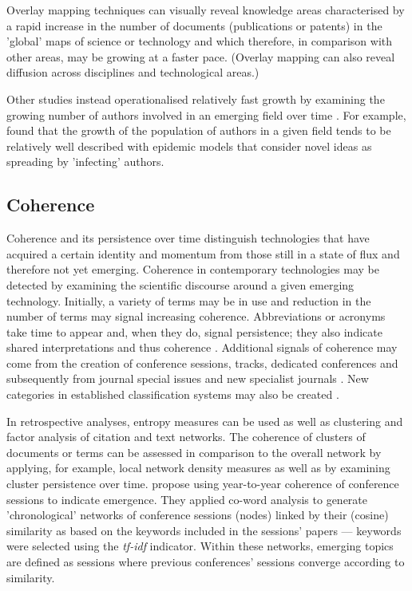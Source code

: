 \documentclass[11pt]{article}
\begin{document}
Overlay mapping techniques can visually reveal knowledge areas characterised by a rapid increase in the number of documents (publications or patents) in the 'global' maps of science or technology and which therefore, in comparison with other areas, may be growing at a faster pace. (Overlay mapping can also reveal diffusion across disciplines and technological areas.)

Other studies instead operationalised relatively fast growth by examining the growing number of authors involved in an emerging field over time \citep[e.g.][]{Guo2011,Bettencourt2008}. For example, \citep{Bettencourt2008} found that the growth of the population of authors in a given field tends to be relatively well described with epidemic models that consider novel ideas as spreading by 'infecting' authors.

\subsection{Coherence}
Coherence and its persistence over time distinguish technologies that have acquired a certain identity and momentum from those still in a state of flux and therefore not yet emerging. Coherence in contemporary technologies may be detected by examining the scientific discourse around a given emerging technology. Initially, a variety of terms may be in use and reduction in the number of terms may signal increasing coherence. Abbreviations or acronyms take time to appear and, when they do, signal persistence; they also indicate shared interpretations and thus coherence \citep{Reardon2014}. Additional signals of coherence may come from the creation of conference sessions, tracks, dedicated conferences and subsequently from journal special issues and new specialist journals \citep{Leydesdorff1994}. New categories in established classification systems may also be created \citep{Cozzens2010}.

In retrospective analyses, entropy measures can be used \citep{Watts2003} as well as clustering and factor analysis of citation and text networks. The coherence of clusters of documents or terms can be assessed in comparison to the overall network by applying, for example, local network density measures as well as by examining cluster persistence over time. \cite{Furukawa2015} propose using year-to-year coherence of conference sessions to indicate emergence. They applied co-word analysis to generate 'chronological' networks of conference sessions (nodes) linked by their (cosine) similarity as based on the keywords included in the sessions' papers --- keywords were selected using the \textit{tf-idf} indicator. Within these networks, emerging topics are defined as sessions where previous conferences' sessions converge according to similarity. 
\end{document}
